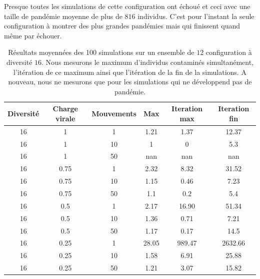 Presque toutes les simulations de cette configuration ont échoué et ceci avec une taille de pandémie moyenne de plus de $816$ individus. C'est pour l'instant la seule configuration à montrer des plus grandes pandémies mais qui finissent quand même par échouer.

\begin{table}[H]
	\centering
	\renewcommand{\arraystretch}{0.6}
	\captionsetup{justification=centering}
	\caption[Statistiques : diversité 16]{Résultats moyennées des 100 simulations sur un ensemble de $12$ configuration à diversité $16$. Nous mesurons le maximum d'individus contaminés simultanément, l'itération de ce maximum ainsi que l'itération de la fin de la simulations. A nouveau, nous ne mesurons que pour les simulations qui ne développend pas de pandémie.\label{tab:grid}}
	\begin{tabular}{@{\extracolsep{\fill} } |c| c| c| c| c| c|}
		\toprule
		Diversité & Charge virale & Mouvements & Max   & Iteration max & Iteration fin \\
		\midrule
		16        & 1             & 1          & 1.21  & 1.37          & 12.37         \\
		\midrule
		16        & 1             & 10         & 1     & 0             & 5.3           \\
		\midrule
		16        & 1             & 50         & nan   & nan           & nan           \\
		\midrule
		16        & 0.75          & 1          & 2.32  & 8.32          & 31.52         \\
		\midrule
		16        & 0.75          & 10         & 1.15  & 0.46          & 7.23          \\
		\midrule
		16        & 0.75          & 50         & 1.1   & 0.2           & 5.4           \\
		\midrule
		16        & 0.5           & 1          & 2.17  & 16.90         & 51.34         \\
		\midrule
		16        & 0.5           & 10         & 1.36  & 0.71          & 7.21          \\
		\midrule
		16        & 0.5           & 50         & 1.17  & 0.17          & 14.5          \\
		\midrule
		16        & 0.25          & 1          & 28.05 & 989.47        & 2632.66       \\
		\midrule
		16        & 0.25          & 10         & 1.58  & 6.91          & 25.88         \\
		\midrule
		16        & 0.25          & 50         & 1.21  & 3.07          & 15.82         \\
		\bottomrule
	\end{tabular}
\end{table}

